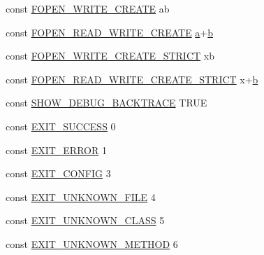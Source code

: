 \begin{DoxyCompactItemize}
\item 
const \hyperlink{application_2config_2constants_8php_a7c5689a170bbaab4dd9c6f3a76bd7a0d}{F\+O\+P\+E\+N\+\_\+\+W\+R\+I\+T\+E\+\_\+\+C\+R\+E\+A\+T\+E} \textquotesingle{}ab\textquotesingle{}
\item 
const \hyperlink{application_2config_2constants_8php_adcd04289bf4dc262b7652cb4c1eb08f7}{F\+O\+P\+E\+N\+\_\+\+R\+E\+A\+D\+\_\+\+W\+R\+I\+T\+E\+\_\+\+C\+R\+E\+A\+T\+E} \textquotesingle{}\hyperlink{_admin_2assets_2js_2bootstrap_8min_8js_a1f5870dcf487187f13d5fd328ed9e6e7}{a}+\hyperlink{_admin_2assets_2js_2bootstrap_8min_8js_a398bb8542498d1b14178b02b99df309b}{b}\textquotesingle{}
\item 
const \hyperlink{application_2config_2constants_8php_a02007ca17f39af174ac54d30f2ca7e82}{F\+O\+P\+E\+N\+\_\+\+W\+R\+I\+T\+E\+\_\+\+C\+R\+E\+A\+T\+E\+\_\+\+S\+T\+R\+I\+C\+T} \textquotesingle{}xb\textquotesingle{}
\item 
const \hyperlink{application_2config_2constants_8php_a2eeb98a015d74560e9b60ec60d7531d4}{F\+O\+P\+E\+N\+\_\+\+R\+E\+A\+D\+\_\+\+W\+R\+I\+T\+E\+\_\+\+C\+R\+E\+A\+T\+E\+\_\+\+S\+T\+R\+I\+C\+T} \textquotesingle{}x+\hyperlink{_admin_2assets_2js_2bootstrap_8min_8js_a398bb8542498d1b14178b02b99df309b}{b}\textquotesingle{}
\item 
const \hyperlink{application_2config_2constants_8php_a7e2dd6fea73799257285946411aeb5ce}{S\+H\+O\+W\+\_\+\+D\+E\+B\+U\+G\+\_\+\+B\+A\+C\+K\+T\+R\+A\+C\+E} T\+R\+U\+E
\item 
const \hyperlink{application_2config_2constants_8php_a44a73f871298e7befa219da1d96c4bf8}{E\+X\+I\+T\+\_\+\+S\+U\+C\+C\+E\+S\+S} 0
\item 
const \hyperlink{application_2config_2constants_8php_a0072a08da382eee32afd352989a3cfc2}{E\+X\+I\+T\+\_\+\+E\+R\+R\+O\+R} 1
\item 
const \hyperlink{application_2config_2constants_8php_a0c5a2fe588c43f68077982ecc971381e}{E\+X\+I\+T\+\_\+\+C\+O\+N\+F\+I\+G} 3
\item 
const \hyperlink{application_2config_2constants_8php_a9d94a7e06ea3247295ecf2f17f077b77}{E\+X\+I\+T\+\_\+\+U\+N\+K\+N\+O\+W\+N\+\_\+\+F\+I\+L\+E} 4
\item 
const \hyperlink{application_2config_2constants_8php_a7b2af799ecefe2b0471c319bafc26850}{E\+X\+I\+T\+\_\+\+U\+N\+K\+N\+O\+W\+N\+\_\+\+C\+L\+A\+S\+S} 5
\item 
const \hyperlink{application_2config_2constants_8php_aeb461d43337d49e2ba92c555caa8597c}{E\+X\+I\+T\+\_\+\+U\+N\+K\+N\+O\+W\+N\+\_\+\+M\+E\+T\+H\+O\+D} 6

\end{DoxyCompactItemize}
